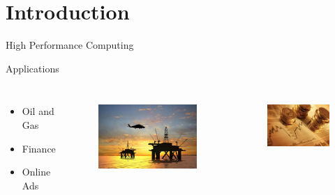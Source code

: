 \section{Introduction}

\begin{frame}{High Performance Computing}
  \vspace{0.5cm}
  \begin{beamerboxesrounded}{Applications}
    \begin{columns}[c]
      \vspace{-1.2cm}
      \begin{itemize}
      \item Oil and Gas
      \item Finance
      \item Online Ads
      \end{itemize}
      \vspace{-1.2cm}
      \begin{columns}
        \begin{figure}[ht]
          \centering
          \includegraphics[scale=0.18]{figs/oil-gas-industry.jpg}\\
        \end{figure}
        \begin{figure}[ht]
          \centering
          \includegraphics[scale=0.29, clip=true, trim=0 0 0 0]{figs/finance.jpg}\\

\end{figure}
\end{columns}
\end{columns}
\end{beamerboxesrounded}
\end{frame}
